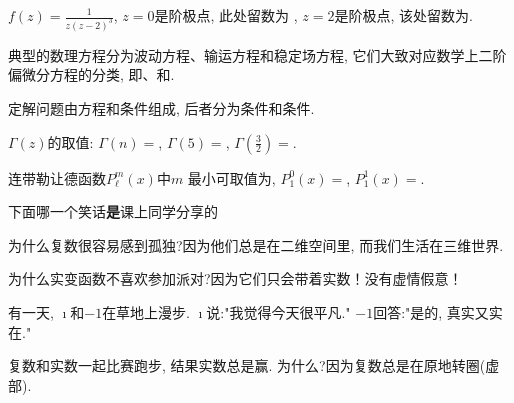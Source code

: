 \documentclass{njustexam}
\begin{document}
\begin{problem}
 $ f(z) = \frac{1}{z( z- 2)^3}$,  $z=0$是阶极点, 此处留数为 , 
 $z=2$是阶极点,  该处留数为. 
\end{problem}

\begin{problem}
典型的数理方程分为波动方程、输运方程和稳定场方程, 
它们大致对应数学上二阶偏微分方程的分类, 即、和. 
\end{problem}

\begin{problem}
  定解问题由方程和条件组成, 后者分为条件和条件. 
\end{problem}

\begin{problem}
$\Gamma(z)$的取值: $\Gamma(n)=$,  
$\Gamma(5)=$, 
 $\Gamma(\frac{3}{2})=$. 
\end{problem}

\begin{problem}
连带勒让德函数$P_\ell^m(x)$中$m$%
最小可取值为\fillout{$-\ell$}, 
$P_1^0(x) = $,  $P_1^1(x) = $. 
\end{problem}


  


\begin{problem}
下面哪一个笑话{\bf{是}}课上同学分享的 
  \begin{abcd}
  \item 为什么复数很容易感到孤独?因为他们总是在二维空间里, 而我们生活在三维世界.    
  \item 为什么实变函数不喜欢参加派对?因为它们只会带着实数！没有虚情假意！
  \item 有一天, $\imath$和$-1$在草地上漫步. $\imath$说:"我觉得今天很平凡." $-1$回答:"是的, 真实又实在."
  \item 复数和实数一起比赛跑步, 结果实数总是赢. 为什么?因为复数总是在原地转圈(虚部). 
  \end{abcd}
  \end{problem}
\end{document}
